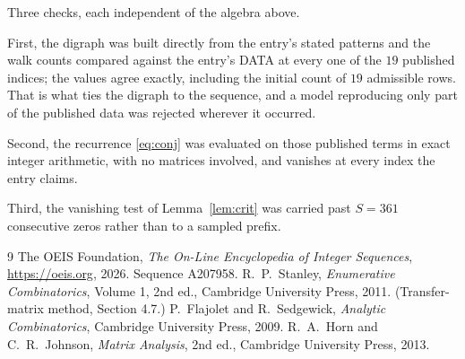 \documentclass[11pt,a4paper]{article}
\theoremstyle{plain}
\theoremstyle{definition}
\begin{document}
Three checks, each independent of the algebra above.

First, the digraph was built directly from the entry's stated patterns and the walk counts
compared against the entry's DATA at every one of the $19$ published indices; the
values agree exactly, including the initial count of $19$ admissible rows. That is
what ties the digraph to the sequence, and a model reproducing only part of the published
data was rejected wherever it occurred.

Second, the recurrence \eqref{eq:conj} was evaluated on those published terms in exact
integer arithmetic, with no matrices involved, and vanishes at every index the entry claims.

Third, the vanishing test of Lemma~\ref{lem:crit} was carried past $S=361$ consecutive
zeros rather than to a sampled prefix.

\begin{thebibliography}{9}
 The OEIS Foundation, \emph{The On-Line Encyclopedia of Integer
Sequences}, \url{https://oeis.org}, 2026. Sequence A207958.
 R.~P.~Stanley, \emph{Enumerative Combinatorics}, Volume 1, 2nd ed.,
Cambridge University Press, 2011. (Transfer-matrix method, Section 4.7.)
 P.~Flajolet and R.~Sedgewick, \emph{Analytic Combinatorics}, Cambridge
University Press, 2009.
 R.~A.~Horn and C.~R.~Johnson, \emph{Matrix Analysis}, 2nd ed., Cambridge
University Press, 2013.
\end{thebibliography}
\end{document}
